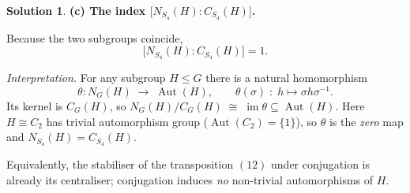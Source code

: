 \documentclass[12pt]{article}
\DeclareMathOperator{\Aut}{Aut}
\theoremstyle{definition} %
\newtheorem{solution}{Solution}
\theoremstyle{plain} %
\begin{document}
\begin{solution}
                  \bigskip
                  \textbf{(c)  The index \(\bigl[N_{S_{4}}(H):C_{S_{4}}(H)\bigr]\).}
                  
                  Because the two subgroups coincide,
                  \[
                     \bigl[N_{S_{4}}(H):C_{S_{4}}(H)\bigr]=1.
                  \]
                  
                  \emph{Interpretation.}  
                  For any subgroup \(H\le G\) there is a natural homomorphism
                  \[
                     \theta:N_{G}(H)\;\longrightarrow\;\Aut(H),
                     \qquad
                     \theta(\sigma)\;:\;h\longmapsto\sigma h\sigma^{-1}.
                  \]
                  Its kernel is \(C_{G}(H)\), so
                  \(
                     N_{G}(H)/C_{G}(H)\;\cong\;\operatorname{im}\theta
                     \subseteq\Aut(H).
                  \)
                  Here \(H\cong C_{2}\) has trivial automorphism group
                  (\(\Aut(C_{2})=\{1\}\)),
                  so \(\theta\) is the \emph{zero} map and \(N_{S_{4}}(H)=C_{S_{4}}(H)\).
                  
                  Equivalently, the stabiliser of the transposition \((12)\) under
                  conjugation is already its centraliser; conjugation induces \emph{no}
                  non-trivial automorphisms of \(H\).
                  
                  \end{solution}
\end{document}
